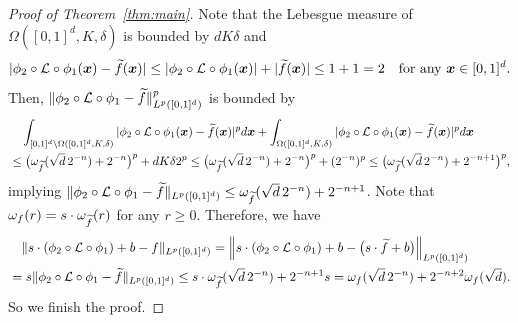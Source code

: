 \documentclass[nohyperref]{article}
\theoremstyle{plain}
\theoremstyle{definition}
\theoremstyle{remark}
\begin{document}
\begin{proof}[Proof of Theorem~\ref{thm:main}]
	Note that the Lebesgue measure of $\Omega([0,1]^d,K,\delta)$ is bounded by $dK\delta$ and
	\begin{equation*}
		|\phi_2\circ{\mathcal{L}}\circ\phi_1({\bm{x}})-{\widetilde{f}}({\bm{x}})|\le |\phi_2\circ{\mathcal{L}}\circ\phi_1({\bm{x}})|+|{\widetilde{f}}({\bm{x}})|\le 1+1=2\quad \textnormal{for any ${\bm{x}}\in [0,1]^d$.}
	\end{equation*}
	Then, $\|\phi_2\circ{\mathcal{L}}\circ\phi_1-{\widetilde{f}}\|_{L^p([0,1]^d)}^p$ is bounded by
	\begin{equation*}
		\begin{split}
			&\quad \int_{[0,1]^d\backslash \Omega([0,1]^d,K,\delta)}|\phi_2\circ{\mathcal{L}}\circ\phi_1({\bm{x}})-{\widetilde{f}}({\bm{x}})|^p d{\bm{x}}
			+\int_{ \Omega([0,1]^d,K,\delta)}|\phi_2\circ{\mathcal{L}}\circ\phi_1({\bm{x}})-{\widetilde{f}}({\bm{x}})|^p d{\bm{x}}\\
			&\le \big(\omega_{\widetilde{f}}(\sqrt{d}\, 2^{-n})+2^{-n}\big)^p+ dK\delta 2^p
			\le \big(\omega_{\widetilde{f}}(\sqrt{d}\, 2^{-n})+2^{-n}\big)^p + (2^{-n})^p\le \big(\omega_{\widetilde{f}}(\sqrt{d}\, 2^{-n})+2^{-n+1}\big)^p,
		\end{split}
	\end{equation*}
	implying $\|\phi_2\circ{\mathcal{L}}\circ\phi_1-{\widetilde{f}}\|_{L^p([0,1]^d)}\le \omega_{\widetilde{f}}(\sqrt{d}\, 2^{-n})+2^{-n+1}$. Note that $\omega_f(r)=s \cdot \omega_{\widetilde{f}}(r)$ for any $r\ge 0$. Therefore, we have 
	\begin{equation*}
		\begin{split}
			&\quad \|s\cdot(\phi_2\circ {\mathcal{L}} \circ \phi_1)+b -f\|_{L^p([0,1]^d)}
			=\Big\|s\cdot (\phi_2\circ {\mathcal{L}} \circ \phi_1)+ b-\big(s\cdot {\widetilde{f}}+b\big)\Big\|_{L^p([0,1]^d)}\\
			&=s\|\phi_2\circ{\mathcal{L}}\circ\phi_1-{\widetilde{f}}\|_{L^p([0,1]^d)}\le s\cdot \omega_{\widetilde{f}}(\sqrt{d}\, 2^{-n})+ 2^{-n+1}  s
			= \omega_f(\sqrt{d}\,2^{-n})+2^{-n+2}\omega_f(\sqrt{d}).
		\end{split}
	\end{equation*}
	So we finish the proof.
\end{proof}




\end{document}
